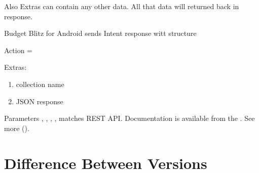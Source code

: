 \documentclass[a4paper,10pt,english]{sphinxmanual}
\begin{document}
\sphinxAtStartPar
Also Extras can contain any other data. All that data will returned back in response.

\sphinxAtStartPar
Budget Blitz for Android sends Intent response witt structure

\sphinxAtStartPar
Action = 

\sphinxAtStartPar
Extras:
\begin{enumerate}
%
\item {} 
\sphinxAtStartPar
{} \sphinxhyphen{} collection name

\item {} 
\sphinxAtStartPar
{} \sphinxhyphen{} JSON response

\end{enumerate}

\sphinxAtStartPar
Parameters , , , ,  matches REST API. Documentation is available from the .
See more {\hyperref[\detokenize{api:sub-chapter-rest-api}]{}} ().

\sphinxstepscope


\chapter{Difference Between Versions}
\label{\detokenize{versions:difference-between-versions}}\label{\detokenize{versions:chapter-versions}}\label{\detokenize{versions::doc}}
\end{document}
